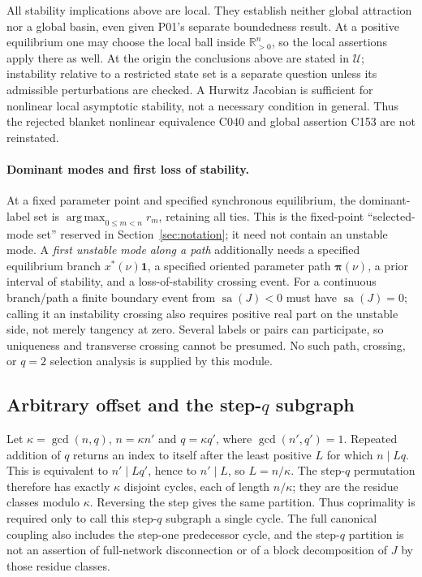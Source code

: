 \documentclass[11pt]{article}
\newcommand{\R}{\mathbb{R}}
\newcommand{\one}{\mathbf{1}}
\newcommand{\PosOrth}{\R_{>0}^{n}}
\newcommand{\Domain}{\mathcal{U}}
\newcommand{\param}{\boldsymbol{\pi}}
\DeclareMathOperator{\sa}{sa}
\DeclareMathOperator*{\argmax}{arg\,max}
\theoremstyle{definition}
\theoremstyle{remark}
\begin{document}
All stability implications above are local. They establish neither
global attraction nor a global basin, even given P01's separate
boundedness result. At a positive equilibrium one may choose the
local ball inside $\PosOrth$, so the local assertions apply there
as well. At the origin the conclusions above are stated in
$\Domain$; instability relative to a restricted state set is a
separate question unless its admissible perturbations are checked.
A Hurwitz Jacobian is sufficient for nonlinear local asymptotic
stability, not a necessary condition in general. Thus the rejected
blanket nonlinear equivalence C040 and global assertion C153 are
not reinstated.

\paragraph{Dominant modes and first loss of stability.}
At a fixed parameter point and specified synchronous equilibrium,
the dominant-label set is $\argmax_{0\le m<n}r_m$, retaining all
ties. This is the fixed-point ``selected-mode set'' reserved in
Section~\ref{sec:notation}; it need not contain an unstable mode.
A \emph{first unstable mode along a path} additionally needs a
specified equilibrium branch $x^*(\nu)\one$, a specified oriented
parameter path $\param(\nu)$, a prior interval of stability, and a
loss-of-stability crossing event. For a continuous branch/path a
finite boundary event from $\sa(J)<0$ must have $\sa(J)=0$;
calling it an instability crossing also requires positive real part
on the unstable side, not merely tangency at zero. Several labels
or pairs can participate, so uniqueness and transverse crossing
cannot be presumed. No such path, crossing, or $q=2$ selection
analysis is supplied by this module.

\subsection{Arbitrary offset and the step-\texorpdfstring{$q$}{q} subgraph}
\label{prop:P04-step-cycles}
Let $\kappa=\gcd(n,q)$, $n=\kappa n'$ and $q=\kappa q'$,
where $\gcd(n',q')=1$. Repeated addition of $q$ returns an index
to itself after the least positive $L$ for which $n\mid Lq$.
This is equivalent to $n'\mid Lq'$, hence to $n'\mid L$,
so $L=n/\kappa$. The step-$q$ permutation therefore has exactly
$\kappa$ disjoint cycles, each of length $n/\kappa$; they are the
residue classes modulo $\kappa$. Reversing the step gives the same
partition. Thus coprimality is required only to call this step-$q$
subgraph a single cycle. The full canonical coupling also includes
the step-one predecessor cycle, and the step-$q$ partition is not
an assertion of full-network disconnection or of a block decomposition
of $J$ by those residue classes.
\end{document}
